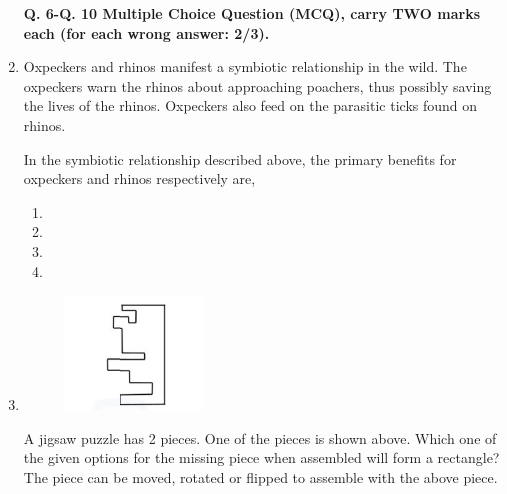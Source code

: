 \documentclass[journal]{IEEEtran}
\begin{document}
\begin{enumerate}[leftmargin=0pt]
\begin{enumerate}
\end{enumerate}

\hfill{}
\textbf{Q. 6-Q. 10 Multiple Choice Question (MCQ), carry TWO marks each (for each wrong answer: 2/3).}

\item Oxpeckers and rhinos manifest a symbiotic relationship in the wild. The
oxpeckers warn the rhinos about approaching poachers, thus possibly
saving the lives of the rhinos. Oxpeckers also feed on the parasitic ticks
found on rhinos.

In the symbiotic relationship described above, the primary benefits for
oxpeckers and rhinos respectively are,

\begin{enumerate}

\item {}
\item {}
\item {}
\item {}

\end{enumerate}

\hfill{}

\item
\begin{figure}[h]
\centering
\includegraphics[width=0.5\columnwidth]{Figs/image (35).png}
\caption*{}
\label{fig:7}
\end{figure}
A jigsaw puzzle has 2 pieces. One of the pieces is shown above. Which one of
the given options for the missing piece when assembled will form a
rectangle? The piece can be moved, rotated or flipped to assemble with the
above piece.


\end{enumerate}
\end{document}
